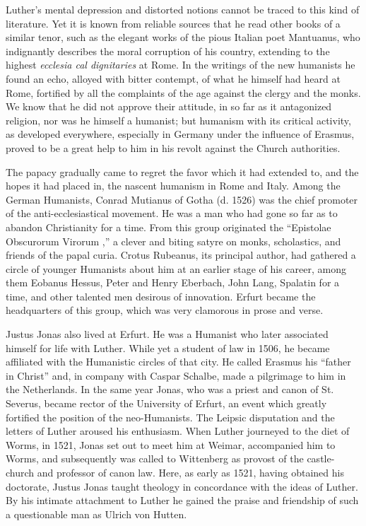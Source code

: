 Luther’s mental depression and distorted notions cannot be traced
to this kind of literature. Yet it is known from reliable sources that
he read other books of a similar tenor, such as the elegant works
of the pious Italian poet Mantuanus, who indignantly describes the moral
corruption of his country, extending to the highest
\textit{ecclesia cal dignitaries} at Rome.
In the writings of the new humanists he
found an echo, alloyed with bitter contempt, of what he himself
had heard at Rome, fortified by all the complaints of the age against
the clergy and the monks. We know that he did not approve their
attitude, in so far as it antagonized religion, nor was he himself a
humanist; but humanism with its critical activity, as developed everywhere,
especially in Germany under the influence of Erasmus, proved
to be a great help to him in his revolt against the Church authorities.

The papacy gradually came to regret the favor which it had extended to,
and the hopes it had placed in, the nascent humanism
in Rome and Italy. Among the German Humanists, Conrad Mutianus
of Gotha (d. 1526) was the chief promoter of the anti-ecclesiastical
movement. He was a man who had gone so far as to abandon Christianity
for a time. From this group originated the “Epistolae Obscurorum Virorum
,” a clever and biting satyre on monks, scholastics, and
friends of the papal curia. Crotus Rubeanus, its principal author,
had gathered a circle of younger Humanists about him at an earlier
stage of his career, among them Eobanus Hessus, Peter and Henry
Eberbach, John Lang, Spalatin for a time, and other talented men
desirous of innovation. Erfurt became the headquarters of this
group, which was very clamorous in prose and verse.

Justus Jonas also lived at Erfurt. He was a Humanist who later
associated himself for life with Luther. While yet a student of law
in 1506, he became affiliated with the Humanistic circles of that
city. He called Erasmus his “father in Christ” and, in company
with Caspar Schalbe, made a pilgrimage to him in the Netherlands.
In the same year Jonas, who was a priest and canon of St. Severus,
became rector of the University of Erfurt, an event which greatly
fortified the position of the neo-Humanists. The Leipsic disputation and
the letters of Luther aroused his enthusiasm. When Luther
journeyed to the diet of Worms, in 1521, Jonas set out to meet him
at Weimar, accompanied him to Worms, and subsequently was
called to Wittenberg as provost of the castle-church and professor
of canon law. Here, as early as 1521, having obtained his doctorate,
Justus Jonas taught theology in concordance with the ideas of Luther.
By his intimate attachment to Luther he gained the praise and friendship
of such a questionable man as Ulrich von Hutten.

